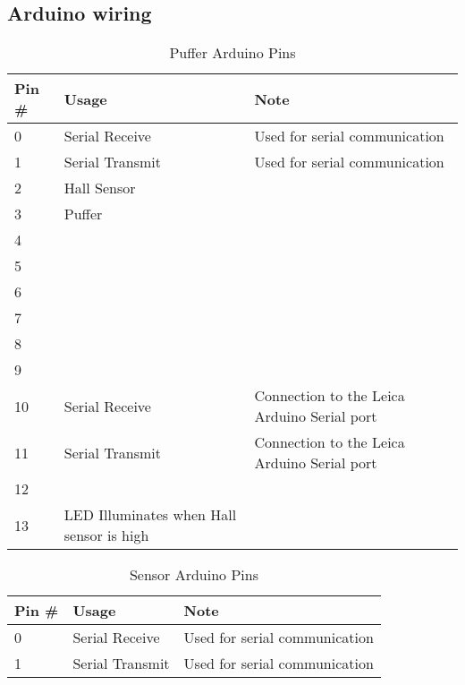 \documentclass[11pt,fleqn]{book} %
\begin{document}
\begin{appendices}
\clearpage

\chapter{Arduino wiring}
\begin{table}[h]
\centering
\begin{tabular}{l l p{160pt}}
\toprule
\textbf{Pin \#} & \textbf{Usage} & \textbf{Note}\\
\midrule
0 	& Serial Receive 	& Used for serial communication \\
1 	& Serial Transmit  	& Used for serial communication \\
2 	& Hall Sensor 		&  \\
3 	& Puffer			&  \\
4 	&  &  \\
5 	&  &  \\
6 	&  &  \\
7 	&  &  \\
8 	&  &  \\
9 	&  &  \\
10 	& Serial Receive  & Connection to the Leica Arduino Serial port \\
11 	& Serial Transmit & Connection to the Leica Arduino Serial port \\
12 	&  &  \\
13 	& LED Illuminates when Hall sensor is high &  \\
\bottomrule
\end{tabular}
\caption{Puffer Arduino Pins}\label{tab:pap}
\end{table}



\begin{table}[h]
\centering
\begin{tabular}{l l p{160pt}}
\toprule
\textbf{Pin \#} & \textbf{Usage} & \textbf{Note}\\
\midrule
0 	& Serial Receive 	& Used for serial communication \\
1 	& Serial Transmit  	& Used for serial communication \\

\bottomrule
\end{tabular}
\caption{Sensor Arduino Pins}
\end{table}



\end{appendices}
\end{document}
